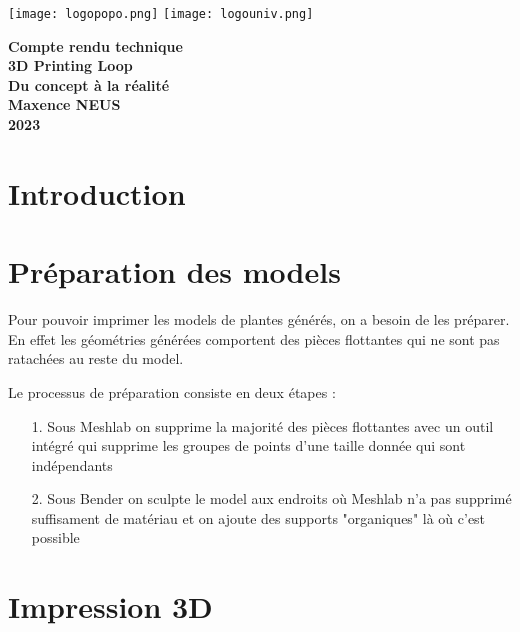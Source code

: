 \documentclass[oneside,a4paper,12pt]{article}
\begin{document}
	\begin{titlepage}
		\texttt{[image: logopopo.png]}
		\hspace*{\fill}
		\texttt{[image: logouniv.png]}
		
		\begin{center}
			\vspace{1cm}
			\textbf{Compte rendu technique}\\
			\vspace{1cm}
			\textbf{\LARGE 3D Printing Loop}\\
			\textbf{\large Du concept à la réalité}\\
			\vspace{10cm}
			\textbf{Maxence NEUS}\\
			
			\vspace{\fill}
			\textbf{2023}\\
		\end{center}
	\end{titlepage}
	
	\tableofcontents
	\newpage
	
	\section{Introduction}
	
	
	
	\section{Préparation des models}
	
	Pour pouvoir imprimer les models de plantes générés, on a besoin de les préparer. En effet les géométries générées comportent des pièces flottantes qui ne sont pas ratachées au reste du model.
	
	Le processus de préparation consiste en deux étapes :
	\begin{itemize}
		\item[1.] Sous Meshlab on supprime la majorité des pièces flottantes avec un outil intégré qui supprime les groupes de points d'une taille donnée qui sont indépendants
		\item[2.] Sous Bender on sculpte le model aux endroits où Meshlab n'a pas supprimé suffisament de matériau et on ajoute des supports "organiques" là où c'est possible
	\end{itemize}
	
	\section{Impression 3D}
	
\end{document}
